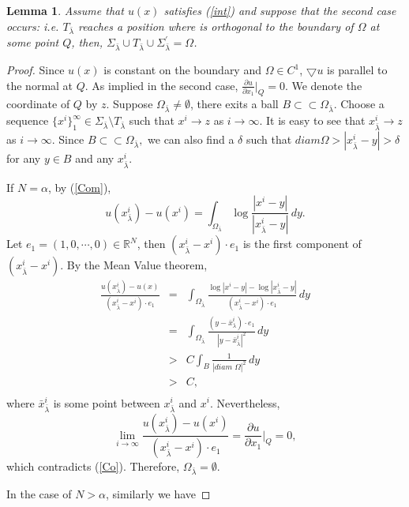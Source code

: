 \documentclass[12pt]{amsproc}
\theoremstyle{plain}
\numberwithin{equation}{section}
\newtheorem{lem}{Lemma}[section]
\begin{document}
\begin{lem}
Assume that $u(x)$ satisfies (\ref{int}) and suppose that the second
case occurs: i.e. $T_{\bar\lambda}$ reaches a position where is
orthogonal to the boundary of $\Omega$ at some point $Q$, then,
$\Sigma_{\bar\lambda}\cup
T_{\bar\lambda}\cup\Sigma^\prime_{\bar\lambda}=\Omega$. \label{la}
\end{lem}
\begin{proof}

 Since $u(x)$ is constant on the boundary and $\Omega\in C^1$,
 ${\mbox{$\bigtriangledown$}} u$ is parallel to the normal at $Q$. As implied in the
 second case, $\frac{\partial u}{\partial x_1}|_Q=0$. We denote the coordinate of $Q$ by $z$. Suppose
 $\Omega_{\bar\lambda}\not=\emptyset$, there exits a ball $
 B\subset\subset
 \Omega_{\bar\lambda}$.
 Choose a sequence $\{x^i\}^\infty_1\in\Sigma_{\bar\lambda}\setminus T_{\bar\lambda}$ such that
$x^i\to z$ as $i\to \infty$. It is easy to see that
$x^i_{\bar\lambda}\to z$ as $i\to \infty$. Since $ B\subset\subset
 \Omega_{\bar\lambda},$ we can also find a $ \delta$ such that $ diam
 \Omega>|x^i_{\bar\lambda}-y|>\delta$ for any $y\in B$ and any $x^i_{\bar\lambda}$.

  If
 $N=\alpha$, by (\ref{Com}),
 $$u(x^i_{\bar\lambda})-u(x^i)=\int_{\Omega_{\bar\lambda}}\log\frac{|x^i-y|}{|x^i_{\bar\lambda}-y|}
 \,dy.$$
 Let $e_1=(1,0,\cdots,0)\in \mathbb R^N$, then $(x^i_{\bar\lambda}-x^i)\cdot e_1$ is the first component of
  $(x^i_{\bar\lambda}-x^i)$.
  By the Mean Value theorem,
 \begin{eqnarray}
 \frac{u(x^i_{\bar\lambda})-u(x)}{(x^i_{\bar\lambda}-x^i)\cdot e_1} &=&
 \int_{\Omega_{\bar\lambda}}\frac{\log|x^i-y|-\log|x^i_{\bar\lambda}-y|}{(x^i_{\bar\lambda}-x^i)\cdot e_1}\,dy \nonumber \\
& = & \int_{\Omega_{\bar\lambda}}\frac{(y-\bar
x^i_{\bar\lambda})\cdot e_1}{|y-\bar x^i_{\bar\lambda}|^2}\,dy \nonumber \\
 & > & C\int_B \frac{1}{|diam\,\,\Omega|^2}\,dy  \nonumber \\
 &>& C, \nonumber \\
 \label{Co}
 \end{eqnarray}
 where $\bar
x^i_{\bar\lambda}$ is some point between $ x^i_{\bar\lambda}$ and
$x^i$. Nevertheless,
$$\lim_{i\to
\infty}\frac{u(x^i_{\bar\lambda})-u(x^i)}{(x^i_{\bar\lambda}-x^i)\cdot
e_1}=\frac{\partial u}{\partial x_1}|_Q=0,$$ which contradicts
(\ref{Co}). Therefore, $\Omega_{\bar\lambda}=\emptyset.$

In the case of $N>\alpha$, similarly we have


\end{proof}
\end{document}
